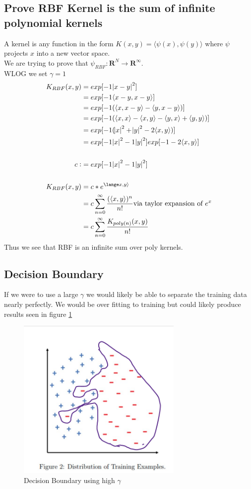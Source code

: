 \documentclass[11pt]{article}
\begin{document}
\subsection{Prove RBF Kernel is the sum of infinite polynomial kernels}
A kernel is any function in the form $K(x, y) = \langle \psi(x), \psi(y)\rangle$ where $\psi$ projects $x$ into a new vector space. \\
We are trying to prove that $\psi_{RBF}: \mathbf{R}^N \rightarrow \mathbf{R}^\infty$. \\
WLOG we set $\gamma = 1$
\begin{equation}
\begin{split}
K_{RBF}(x, y)  &= exp [-1 \abs{x -y}^2] \\
& = exp [-1 \langle x -y, x-y \rangle] \\
& = exp [-1 (\langle x, x -y \rangle - \langle y, x-y \rangle)] \\
& = exp [-1 (\langle x, x \rangle - \langle x,y \rangle -\langle y, x \rangle + \langle y,y \rangle)] \\
& = exp [-1 (\abs{x}^2 + \abs{y}^2 - 2 \langle x, y \rangle)] \\
& = exp[-1\abs{x}^2-1\abs{y}^2 ]exp[-1 -2 \langle x, y \rangle] \\ \\
c :&= exp[-1\abs{x}^2-1\abs{y}^2 ] \\ \\
K_{RBF}(x, y) &= c*e^{\lange x, y \rangle} \\
&= c \sum_{n=0}^{\infty} \frac{(\langle x, y \rangle)^n}{n!}  \text{via taylor expansion of $e^x$}  \\ 
&= c \sum_{n=0}^{\infty} \frac{K_{poly(n)}(x,y)}{n!} \\
\end{split}
\end{equation}
Thus we see that RBF is an infinite sum over poly kernels.
\subsection{Decision Boundary}
If we were to use a large $\gamma$ we would likely be able to separate the training data nearly perfectly. We would be over fitting to training but could likely produce results seen in figure \ref{fig:bound}
\begin{figure}[]
\centering
\includegraphics[width=8cm]{Assignments/Assignment1/decisionbound.png}
\caption{Decision Boundary using high $\gamma$}
\label{fig:bound}
\end{figure}
\end{document}
